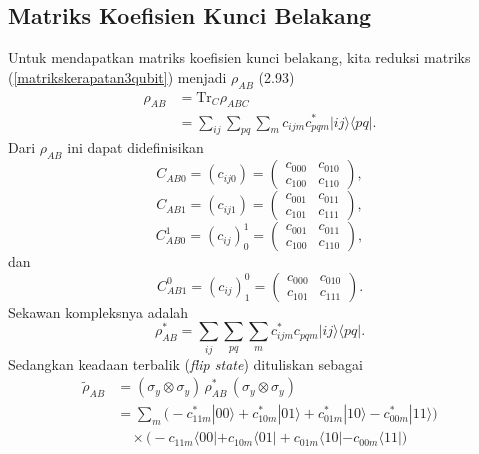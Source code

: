 \subsection{Matriks Koefisien Kunci Belakang}
Untuk mendapatkan matriks koefisien kunci belakang, kita reduksi matriks (\ref{matrikskerapatan3qubit}) menjadi $\rho_{AB}$ (2.93)
\begin{equation*}
	\begin{aligned}
		\rho_{AB}
		&=\mathrm{Tr}_C\rho_{ABC}\\
		&= \sum_{i j} \sum_{p q}\sum_m
		c_{i j m} c^{*}_{p q m}
		| i j \rangle \langle p q |.
	\end{aligned}
\end{equation*}
Dari $\rho_{AB}$ ini dapat didefinisikan
\begin{equation}
	C_{AB0}=(c_{ij0})=
	\begin{pmatrix}
		c_{000} & c_{010} \\
		c_{100} & c_{110}
	\end{pmatrix},
\end{equation}
\begin{equation}
	C_{AB1}=(c_{ij1})=
	\begin{pmatrix}
		c_{001} & c_{011} \\
		c_{101} & c_{111}
	\end{pmatrix},
\end{equation}
\begin{equation}
	C_{AB0}^1=(c_{ij})_0^1=
	\begin{pmatrix}
		c_{001} & c_{011} \\
		c_{100} & c_{110}
	\end{pmatrix},
\end{equation}
dan
\begin{equation}
	C_{AB1}^0=(c_{ij})_1^0=
	\begin{pmatrix}
		c_{000} & c_{010} \\
		c_{101} & c_{111}
	\end{pmatrix}.
\end{equation}
Sekawan kompleksnya adalah
\begin{equation}
	\rho^{*}_{AB}
	= \sum_{i j} \sum_{p q} \sum_m
	c^{*}_{i j m} c_{p q m}
	| i j \rangle \langle p q|.
\end{equation}
Sedangkan keadaan terbalik (\textit{flip state}) dituliskan sebagai
\begin{equation}
	\begin{aligned}
		\tilde{\rho}_{AB}
		&= (\sigma_y \otimes \sigma_y)\,
		\rho^{*}_{AB}\,
		(\sigma_y \otimes \sigma_y) \\
		&= \sum_m
		\Big(
		- c^{*}_{11m} |00\rangle
		+ c^{*}_{10m} |01\rangle
		+ c^{*}_{01m} |10\rangle
		- c^{*}_{00m} |11\rangle
		\Big) \\
		&\quad \times
		\Big(
		- c_{11m} \langle 00|
		+ c_{10m} \langle 01|
		+ c_{01m} \langle 10|
		- c_{00m} \langle 11|
		\Big)
	\end{aligned}
\end{equation}
